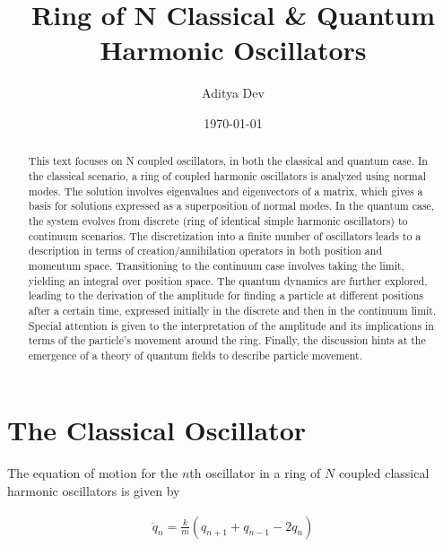 \documentclass[pre,floatfix,onecolumn]{revtex4-2}
\begin{document}
\title{\Large \bfseries \sffamily Ring of N Classical \& Quantum Harmonic Oscillators}%

\author{Aditya Dev}
%

\date{\today}%


\begin{abstract}
This text focuses on N coupled oscillators, in both the classical and quantum case. In the classical scenario, a ring of coupled harmonic oscillators is analyzed using normal modes. The solution involves eigenvalues and eigenvectors of a matrix, which gives a basis for solutions expressed as a superposition of normal modes. In the quantum case, the system evolves from discrete (ring of identical simple harmonic oscillators) to continuum scenarios. The discretization into a finite number of oscillators leads to a description in terms of creation/annihilation operators in both position and momentum space. Transitioning to the continuum case involves taking the limit, yielding an integral over position space. The quantum dynamics are further explored, leading to the derivation of the amplitude for finding a particle at different positions after a certain time, expressed initially in the discrete and then in the continuum limit. Special attention is given to the interpretation of the amplitude and its implications in terms of the particle's movement around the ring. Finally, the discussion hints at the emergence of a theory of quantum fields to describe particle movement.
\end{abstract}
\maketitle
\tableofcontents

\section{The Classical Oscillator}
The equation of motion for the $n$th oscillator in a ring of $N$ coupled classical harmonic oscillators is given by

\begin{align}
\ddot{q}_{n} = \frac{k}{m}\left(q_{n+1} + q_{n-1} - 2 q_{n}\right)
\end{align}
\end{document}
